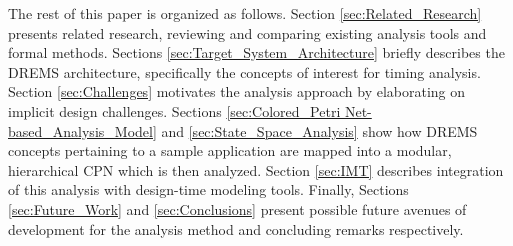 The rest of this paper is organized as follows. Section \ref{sec:Related_Research} presents related research, reviewing and comparing existing analysis tools and formal methods. Sections \ref{sec:Target_System_Architecture} briefly describes the DREMS architecture, specifically the concepts of interest for timing analysis. Section \ref{sec:Challenges} motivates the analysis approach by elaborating on implicit design challenges. Sections \ref{sec:Colored_Petri Net-based_Analysis_Model} and \ref{sec:State_Space_Analysis} show how DREMS concepts pertaining to a sample application are mapped into a modular, hierarchical CPN which is then analyzed. Section \ref{sec:IMT} describes integration of this analysis with design-time modeling tools. Finally, Sections \ref{sec:Future_Work} and \ref{sec:Conclusions} present possible future avenues of development for the analysis method and concluding remarks respectively.